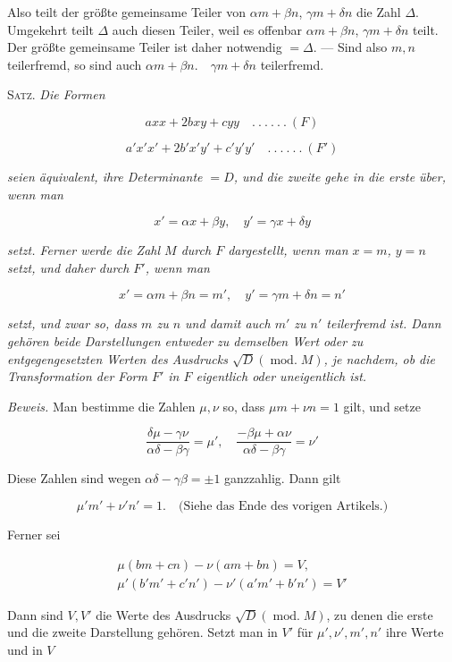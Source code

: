 Also teilt der größte gemeinsame Teiler von $\alpha m+\beta n$, $\gamma m+\delta n$ die Zahl $\Delta$. Umgekehrt teilt $\Delta$ auch diesen Teiler, weil es offenbar $\alpha m+\beta n$, $\gamma m+\delta n$ teilt. Der größte gemeinsame Teiler ist daher notwendig $=\Delta.$ --- Sind also $m,n$ teilerfremd, so sind auch $\alpha m+\beta n.\quad\gamma m+\delta n$ teilerfremd.


\textsc{Satz.} \emph{Die Formen}

\[
axx+2bxy+cyy\quad .\ .\ .\ .\ .\ .\ (F)
\]

\[
a'x'x'+2b'x'y'+c'y'y'\quad .\ .\ .\ .\ .\ .\ (F')
\]

\emph{seien äquivalent, ihre Determinante $=D$, und die zweite gehe in die erste über, wenn man}

\[
x'=\alpha x+\beta y,\quad y'=\gamma x+\delta y
\]


\emph{setzt. Ferner werde die Zahl $M$ durch $F$ dargestellt, wenn man $x=m$, $y=n$ setzt, und daher durch $F'$, wenn man}

\[
x'=\alpha m+\beta n=m',\quad y'=\gamma m+\delta n=n'
\]

\emph{setzt, und zwar so, dass $m$ zu $n$ und damit auch $m'$ zu $n'$ teilerfremd ist. Dann gehören beide Darstellungen entweder zu demselben Wert oder zu entgegengesetzten Werten des Ausdrucks $\surd D(\operatorname{mod.}M)$, je nachdem, ob die Transformation der Form $F'$ in $F$ eigentlich oder uneigentlich ist.}

\emph{Beweis.} Man bestimme die Zahlen $\mu,\nu$ so, dass $\mu m+\nu n=1$ gilt, und setze

\[
\frac{\delta\mu-\gamma\nu}{\alpha\delta-\beta\gamma}=\mu',\quad \frac{-\beta\mu+\alpha\nu}{\alpha\delta-\beta\gamma}=\nu'
\]

Diese Zahlen sind wegen $\alpha\delta-\gamma\beta=\pm1$ ganzzahlig. Dann gilt

\[
\mu'm'+\nu'n'=1.\quad\text{(Siehe das Ende des vorigen Artikels.)}
\]

Ferner sei

\[
\begin{gathered}\mu(bm+cn)-\nu(am+bn)=V,\\\mu'(b'm'+c'n')-\nu'(a'm'+b'n')=V'\end{gathered}
\]

Dann sind $V,V'$ die Werte des Ausdrucks $\surd D(\operatorname{mod.}M)$, zu denen die erste und die zweite Darstellung gehören. Setzt man in $V'$ für $\mu',\nu',m',n'$ ihre Werte und in $V$

